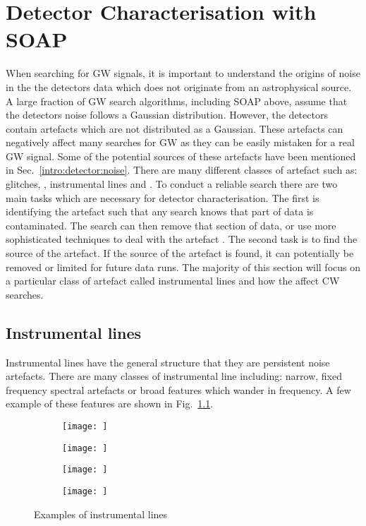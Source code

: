 \chapter{\label{detchar}Detector Characterisation with SOAP}

When searching for \ac{GW} signals, it is important to understand the origins of noise in the the detectors data which does not originate from an astrophysical source.
A large fraction of \ac{GW} search algorithms, including SOAP above, assume that the detectors noise follows a Gaussian distribution.
However, the detectors contain artefacts which are not distributed as a Gaussian. 
These artefacts can negatively affect many searches for \ac{GW} as they can be easily mistaken for a real \ac{GW} signal.
Some of the potential sources of these artefacts have been mentioned in Sec.~\ref{intro:detector:noise}. 
There are many different classes of artefact such as: glitches, , instrumental lines and .
To conduct a reliable search there are two main tasks which are necessary for detector characterisation.
The first is identifying the artefact such that any search knows that part of data is contaminated.
The search can then remove that section of data, or use more sophisticated techniques to deal with the artefact \citep{}.
The second task is to find the source of the artefact. 
If the source of the artefact is found, it can potentially be removed or limited for future data runs.
The majority of this section will focus on a particular class of artefact called instrumental lines and how the affect \ac{CW} searches.





\section{Instrumental lines}

Instrumental lines have the general structure that they are persistent noise artefacts.
There are many classes of instrumental line including: narrow, fixed frequency spectral artefacts or broad features which wander in frequency.
A few example of these features are shown in Fig.~\ref{}. 

\begin{figure}
\begin{subfigure}
    \centering
    \texttt{[image: ]}
    \label{fig:my_label}
\end{subfigure}
\begin{subfigure}
    \centering
    \texttt{[image: ]}
    \label{fig:my_label}
\end{subfigure}
\begin{subfigure}
    \centering
    \texttt{[image: ]}
    \label{fig:my_label}
\end{subfigure}
\begin{subfigure}
    \centering
    \texttt{[image: ]}
    \label{fig:my_label}
\end{subfigure}
    \caption{Examples of instrumental lines}
    \label{detchar:lines:examples}
\end{figure}

